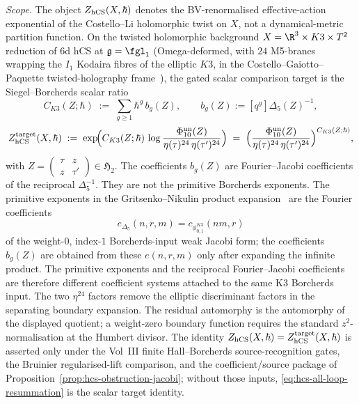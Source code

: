 \begin{theorem}
\label{thm:hcs-all-loop-resummation}
\emph{Scope.} The object $Z_{\mathrm{hCS}}(X,\hbar)$ denotes the
BV-renormalised effective-action exponential of the Costello--Li
holomorphic twist on $X$, not a dynamical-metric partition function.
On the twisted holomorphic background
$X = \R^{3}\times K3\times T^{2}$ reduction of 6d hCS at $\fg = \fgl_{1}$
(Omega-deformed, with $24$ M5-branes wrapping the $I_{1}$ Kodaira
fibres of the elliptic $K3$, in the Costello--Gaiotto--Paquette
twisted-holography frame~\cite{CostelloGaiottoPaquette2018}), the
gated scalar comparison target is the Siegel--Borcherds scalar ratio
\begin{equation}\label{eq:hcs-k3-coeff-series}
 C_{K3}(Z;\hbar)
 \;:=\;
 \sum_{g\ge 1}\hbar^{g}\,b_g(Z),
 \qquad
 b_g(Z):=[q^g]\Delta_5(Z)^{-1},
\end{equation}
\begin{equation}\label{eq:hcs-all-loop-resummation}
 Z_{\mathrm{hCS}}^{\mathrm{target}}(X,\hbar)
 \;:=\;
 \exp\!\Bigl(
 C_{K3}(Z;\hbar)\,
 \log\frac{\Phi_{10}^{\mathrm{un}}(Z)}{\eta(\tau)^{24}\,\eta(\tau')^{24}}\Bigr)
 \;=\;
 \Bigl(\frac{\Phi_{10}^{\mathrm{un}}(Z)}{\eta(\tau)^{24}\,\eta(\tau')^{24}}\Bigr)^{C_{K3}(Z;\hbar)},
\end{equation}
with $Z=\begin{pmatrix}\tau&z\\z&\tau'\end{pmatrix}\in\mathfrak H_{2}$.
The coefficients $b_g(Z)$ are Fourier--Jacobi coefficients of the
reciprocal \(\Delta_5^{-1}\). They are not the primitive Borcherds
exponents. The primitive exponents in the
Gritsenko--Nikulin product expansion~\cite[(2.2)]{GritsenkoNikulin1998}
are the Fourier coefficients
\[
e_{\Delta_5}(n,r,m)=c_{\phi_{0,1}^{K3}}(nm,r)
\]
of the weight-$0$, index-$1$ Borcherds-input weak Jacobi form;
the coefficients \(b_g(Z)\) are obtained from these \(e(n,r,m)\) only
after expanding the infinite product. The primitive exponents and the
reciprocal Fourier--Jacobi coefficients are therefore different
coefficient systems attached to the same K3 Borcherds input. The two $\eta^{24}$
factors remove the elliptic discriminant factors in the separating
boundary expansion. The residual automorphy is the automorphy of the
displayed quotient; a weight-zero boundary function requires the
standard \(z^2\)-normalisation at the Humbert divisor.  The identity
$Z_{\mathrm{hCS}}(X,\hbar)=Z_{\mathrm{hCS}}^{\mathrm{target}}(X,\hbar)$ is asserted
only under the Vol~III finite Hall--Borcherds source-recognition gates,
the Bruinier regularised-lift comparison, and the coefficient/source
package of Proposition~\ref{prop:hcs-obstruction-jacobi}; without
those inputs, \eqref{eq:hcs-all-loop-resummation} is the scalar target
identity.
\end{theorem}

